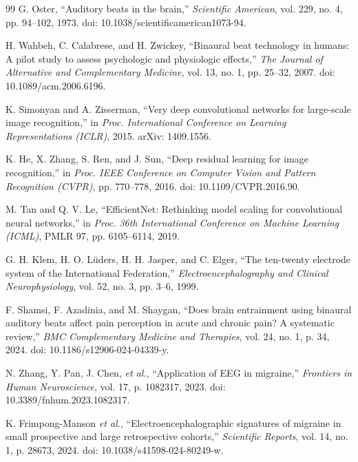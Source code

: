 \documentclass[12pt, a4paper]{report}
\begin{document}
\begin{thebibliography}{99}
G. Oster, ``Auditory beats in the brain,'' \textit{Scientific American}, vol. 229, no. 4, pp. 94--102, 1973. doi: 10.1038/scientificamerican1073-94.

H. Wahbeh, C. Calabrese, and H. Zwickey, ``Binaural beat technology in humans: A pilot study to assess psychologic and physiologic effects,'' \textit{The Journal of Alternative and Complementary Medicine}, vol. 13, no. 1, pp. 25--32, 2007. doi: 10.1089/acm.2006.6196.

K. Simonyan and A. Zisserman, ``Very deep convolutional networks for large-scale image recognition,'' in \textit{Proc. International Conference on Learning Representations (ICLR)}, 2015. arXiv: 1409.1556.

K. He, X. Zhang, S. Ren, and J. Sun, ``Deep residual learning for image recognition,'' in \textit{Proc. IEEE Conference on Computer Vision and Pattern Recognition (CVPR)}, pp. 770--778, 2016. doi: 10.1109/CVPR.2016.90.

M. Tan and Q. V. Le, ``EfficientNet: Rethinking model scaling for convolutional neural networks,'' in \textit{Proc. 36th International Conference on Machine Learning (ICML)}, PMLR 97, pp. 6105--6114, 2019.

G. H. Klem, H. O. L\"uders, H. H. Jasper, and C. Elger, ``The ten-twenty electrode system of the International Federation,'' \textit{Electroencephalography and Clinical Neurophysiology}, vol. 52, no. 3, pp. 3--6, 1999.

F. Shamsi, F. Azadinia, and M. Shaygan, ``Does brain entrainment using binaural auditory beats affect pain perception in acute and chronic pain? A systematic review,'' \textit{BMC Complementary Medicine and Therapies}, vol. 24, no. 1, p. 34, 2024. doi: 10.1186/s12906-024-04339-y.

N. Zhang, Y. Pan, J. Chen, \textit{et al.}, ``Application of EEG in migraine,'' \textit{Frontiers in Human Neuroscience}, vol. 17, p. 1082317, 2023. doi: 10.3389/fnhum.2023.1082317.

K. Frimpong-Manson \textit{et al.}, ``Electroencephalographic signatures of migraine in small prospective and large retrospective cohorts,'' \textit{Scientific Reports}, vol. 14, no. 1, p. 28673, 2024. doi: 10.1038/s41598-024-80249-w.


\end{thebibliography}
\end{document}
